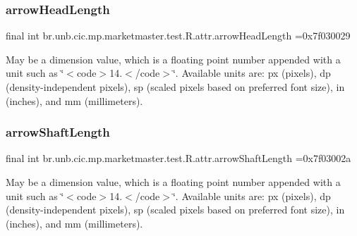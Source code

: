 \subsubsection{\texorpdfstring{arrow\+Head\+Length}{arrowHeadLength}}
{\footnotesize\ttfamily final int br.\+unb.\+cic.\+mp.\+marketmaster.\+test.\+R.\+attr.\+arrow\+Head\+Length =0x7f030029\hspace{0.3cm}{\ttfamily [static]}}

May be a dimension value, which is a floating point number appended with a unit such as \char`\"{}$<$code$>$14.\+5sp$<$/code$>$\char`\"{}. Available units are\+: px (pixels), dp (density-\/independent pixels), sp (scaled pixels based on preferred font size), in (inches), and mm (millimeters). \mbox{\label{classbr_1_1unb_1_1cic_1_1mp_1_1marketmaster_1_1test_1_1R_1_1attr_a71b1c478dc4286522e9055b8d07fff32}} 
\subsubsection{\texorpdfstring{arrow\+Shaft\+Length}{arrowShaftLength}}
{\footnotesize\ttfamily final int br.\+unb.\+cic.\+mp.\+marketmaster.\+test.\+R.\+attr.\+arrow\+Shaft\+Length =0x7f03002a\hspace{0.3cm}{\ttfamily [static]}}

May be a dimension value, which is a floating point number appended with a unit such as \char`\"{}$<$code$>$14.\+5sp$<$/code$>$\char`\"{}. Available units are\+: px (pixels), dp (density-\/independent pixels), sp (scaled pixels based on preferred font size), in (inches), and mm (millimeters). \mbox{\label{classbr_1_1unb_1_1cic_1_1mp_1_1marketmaster_1_1test_1_1R_1_1attr_a00c55e3a9f2d6162f6f88fc6dd3dbecc}} 
